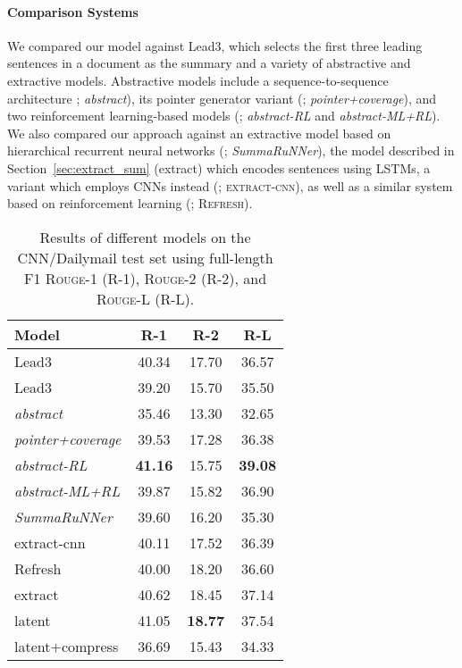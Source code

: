 \documentclass[11pt,a4paper]{article}
\begin{document}
\paragraph{Comparison Systems}
We compared our model against {\sc Lead3}, which selects the first
three leading sentences in a document as the summary and a variety of
abstractive and extractive models. Abstractive models include a
sequence-to-sequence architecture \cite{nallapati:2016:arxiv};
\emph{abstract}), its pointer generator variant
(\citealt{see:2017:acl}; {\it pointer+coverage}), and two
reinforcement learning-based models (\citealt{paulus:2017:arxiv}; {\it
  abstract-RL} and {\it abstract-ML+RL}).  We also compared our
approach against an extractive model based on hierarchical recurrent
neural networks (\citealt{nallapati:2017:aaai}; {\it SummaRuNNer}),
the model described in
Section~\ref{sec:extract_sum} ({\sc extract}) which encodes sentences
using LSTMs, a variant which employs CNNs instead
(\citealt{cheng:2016:acl};  \textsc{extract-cnn}), as well as a
similar system based on reinforcement learning
(\citealt{Narayan:ea:2018}; \textsc{Refresh}).








\begin{table}
	\centering
	\small
	\begin{tabular}[t]{|@{~}l @{~}|@{~}c c c@{~}|}
          \hline
          Model & R-1 & R-2 & R-L \\
          \hline
          \hline
          {\sc Lead3} & 40.34 & 17.70 & 36.57 \\
          {\sc Lead3} \cite{nallapati:2017:aaai} & 39.20 & 15.70 &
          35.50 \\
{\it abstract} & 35.46 & 13.30 & 32.65 \\
          {\it pointer+coverage} & 39.53 & 17.28 & 36.38 \\
          {\it abstract-RL}  & {\bf 41.16} & 15.75 & {\bf 39.08} \\
          {\it abstract-ML+RL} & 39.87 & 15.82 & 36.90 \\ \hline\hline
          {\it SummaRuNNer} & 39.60 & 16.20 & 35.30 \\
          {\sc extract-cnn} & 40.11 & 17.52 & 36.39 \\
          {\sc Refresh} \cite{Narayan:ea:2018} & 40.00 & 18.20 & 36.60 \\
          {\sc extract} & 40.62 & 18.45 & 37.14 \\
          {\sc latent} & 41.05 & {\bf 18.77} & 37.54 \\
          {\sc latent+compress} & 36.69 & 15.43 & 34.33 \\
          \hline
	\end{tabular}
	\caption{Results of different models on the CNN/Dailymail test
          set using full-length F1 \mbox{\textsc{Rouge-1}} (R-1),
          \textsc{Rouge-2} (R-2), and \textsc{Rouge-L} (R-L).}

	\label{tbl:cnndaily}
\end{table}
\end{document}
